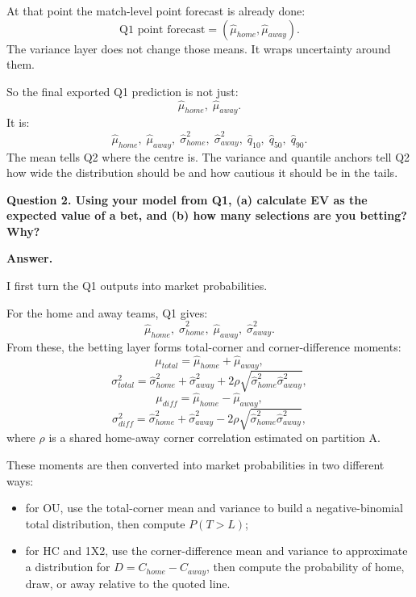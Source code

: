 \documentclass{article}
\begin{document}
At that point the match-level point forecast is already done:
\[
\text{Q1 point forecast}=(\hat{\mu}_{home}, \hat{\mu}_{away}).
\]
The variance layer does not change those means. It wraps uncertainty around them.

So the final exported Q1 prediction is not just:
\[
\hat{\mu}_{home},\;\hat{\mu}_{away}.
\]
It is:
\[
\hat{\mu}_{home},\;
\hat{\mu}_{away},\;
\hat{\sigma}^{2}_{home},\;
\hat{\sigma}^{2}_{away},\;
\hat{q}_{10},\;
\hat{q}_{50},\;
\hat{q}_{90}.
\]
The mean tells Q2 where the centre is. The variance and quantile anchors tell Q2 how wide the distribution should be and how cautious it should be in the tails.

\bigskip

\noindent \textbf{Question 2. Using your model from Q1, (a) calculate EV as the expected value of a bet, and (b) how many selections are you betting? Why?}

\noindent \textbf{Answer.} 
 
I first turn the Q1 outputs into market probabilities.

For the home and away teams, Q1 gives:
\[
\hat{\mu}_{home},\;\hat{\sigma}^{2}_{home},\;\hat{\mu}_{away},\;\hat{\sigma}^{2}_{away}.
\]
From these, the betting layer forms total-corner and corner-difference moments:
\[
\mu_{total}=\hat{\mu}_{home}+\hat{\mu}_{away},
\]
\[
\sigma^{2}_{total}=\hat{\sigma}^{2}_{home}+\hat{\sigma}^{2}_{away}
+2\rho\sqrt{\hat{\sigma}^{2}_{home}\hat{\sigma}^{2}_{away}},
\]
\[
\mu_{diff}=\hat{\mu}_{home}-\hat{\mu}_{away},
\]
\[
\sigma^{2}_{diff}=\hat{\sigma}^{2}_{home}+\hat{\sigma}^{2}_{away}
-2\rho\sqrt{\hat{\sigma}^{2}_{home}\hat{\sigma}^{2}_{away}},
\]
where \(\rho\) is a shared home-away corner correlation estimated on partition A.

These moments are then converted into market probabilities in two different ways:
\begin{itemize}
    \item for OU, use the total-corner mean and variance to build a negative-binomial total distribution, then compute \(P(T>L)\);
    \item for HC and 1X2, use the corner-difference mean and variance to approximate a distribution for \(D=C_{home}-C_{away}\), then compute the probability of home, draw, or away relative to the quoted line.
\end{itemize}
\end{document}
